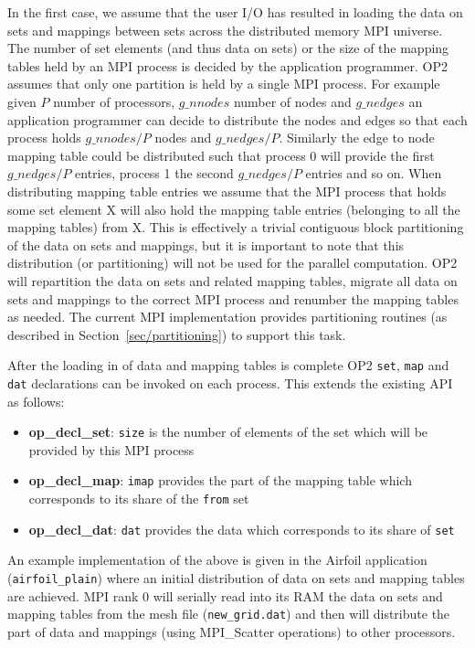 \documentclass[11pt]{article}
\begin{document}
In the first case, we assume that the user I/O has resulted in loading the data
on sets and mappings between sets across the distributed memory MPI universe.
The number of set elements (and thus data on sets) or the size of the mapping
tables held by an MPI process is decided by the application programmer. OP2
assumes that only one partition is held by a single MPI process. For example
given $P$ number of processors, $g\_nnodes$ number of nodes and $g\_nedges$
an application programmer can decide to distribute the nodes and edges so that
each process holds $g\_nnodes/P$ nodes and $g\_nedges/P$. Similarly the edge to
node mapping table could be distributed such that process 0 will provide the
first $g\_nedges/P$ entries, process 1 the second $g\_nedges/P$ entries and so
on. When distributing mapping table entries we assume that the MPI process that
holds some set element X will also hold the mapping table entries (belonging
to all the mapping tables) from X. This is effectively a trivial contiguous
block partitioning of the data on sets and mappings, but it is important to note
that this distribution (or partitioning) will not be used for the parallel
computation. OP2 will repartition the data on sets and related mapping tables,
migrate all data on sets and mappings to the correct MPI process and renumber
the mapping tables as needed. The current MPI implementation provides
partitioning routines (as described in Section~\ref{sec/partitioning}) to
support this task.

\noindent After the loading in of data and mapping tables is complete OP2
\texttt{set}, \texttt{map} and \texttt{dat} declarations can be invoked on each
process. This extends the existing API as follows:
\begin{itemize}
\item {\bf op\_decl\_set}: {\tt size} is the number of elements of the set which
will be provided by this MPI process

\item {\bf op\_decl\_map}: {\tt imap} provides the part of the mapping table
which corresponds to its share of the {\tt from} set

\item {\bf op\_decl\_dat}: {\tt dat} provides the data which corresponds to its
share of {\tt set}
\end{itemize}
\noindent An example implementation of the above is given in the Airfoil application (\texttt{airfoil\_plain}) where an
initial  distribution of data on sets and mapping tables are achieved. MPI rank 0 will serially read into its RAM the
data on sets and mapping tables from the mesh file (\texttt{new\_grid.dat}) and then will distribute the part of data
and mappings (using MPI\_Scatter operations) to other processors.\\
\end{document}
